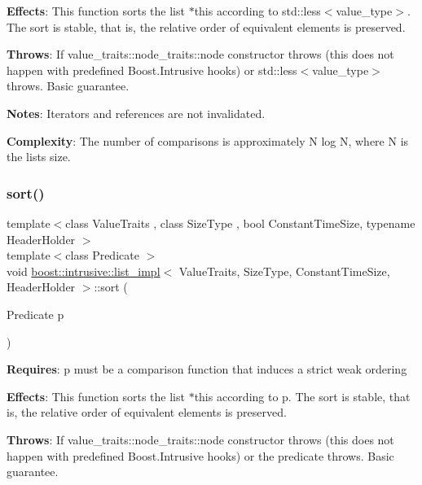 {\bfseries Effects}\+: This function sorts the list $\ast$this according to std\+::less$<$value\+\_\+type$>$. The sort is stable, that is, the relative order of equivalent elements is preserved.

{\bfseries Throws}\+: If value\+\_\+traits\+::node\+\_\+traits\+::node constructor throws (this does not happen with predefined Boost.\+Intrusive hooks) or std\+::less$<$value\+\_\+type$>$ throws. Basic guarantee.

{\bfseries Notes}\+: Iterators and references are not invalidated.

{\bfseries Complexity}\+: The number of comparisons is approximately N log N, where N is the list\textquotesingle{}s size. \mbox{\label{classboost_1_1intrusive_1_1list__impl_a76891ada0d200ee89011b08ce5d548c0}} 
\subsubsection{\texorpdfstring{sort()}{sort()}\hspace{0.1cm}{\footnotesize\ttfamily [2/2]}}
{\footnotesize\ttfamily template$<$class Value\+Traits , class Size\+Type , bool Constant\+Time\+Size, typename Header\+Holder $>$ \\
template$<$class Predicate $>$ \\
void \hyperlink{classboost_1_1intrusive_1_1list__impl}{boost\+::intrusive\+::list\+\_\+impl}$<$ Value\+Traits, Size\+Type, Constant\+Time\+Size, Header\+Holder $>$\+::sort (\begin{DoxyParamCaption}\item[{Predicate}]{p }\end{DoxyParamCaption})\hspace{0.3cm}{\ttfamily [inline]}}

{\bfseries Requires}\+: p must be a comparison function that induces a strict weak ordering

{\bfseries Effects}\+: This function sorts the list $\ast$this according to p. The sort is stable, that is, the relative order of equivalent elements is preserved.

{\bfseries Throws}\+: If value\+\_\+traits\+::node\+\_\+traits\+::node constructor throws (this does not happen with predefined Boost.\+Intrusive hooks) or the predicate throws. Basic guarantee.

